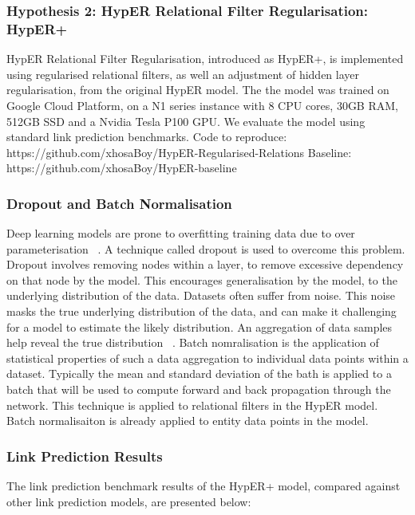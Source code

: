 \subsubsection{Hypothesis 2: \newline 
HypER Relational Filter Regularisation: HypER+}
HypER Relational Filter Regularisation, introduced as HypER+, is implemented using regularised relational filters, as well an adjustment of hidden layer regularisation, from the original HypER model. \newline
The the model was trained on Google Cloud Platform, on a N1 series instance with  8 CPU cores, 30GB RAM, 512GB SSD and a Nvidia Tesla P100 GPU. \newline
We evaluate the model using standard link prediction benchmarks. \newline 
Code to reproduce: https://github.com/xhosaBoy/HypER-Regularised-Relations \newline
Baseline: https://github.com/xhosaBoy/HypER-baseline

\subsubsection{Dropout and Batch Normalisation}
Deep learning models are prone to overfitting training data due to over parameterisation ~\citep{dropout paper}. A technique called dropout is used to overcome this problem. 
Dropout involves removing nodes within a layer, to remove excessive dependency on that node by the model. This encourages generalisation by the model, to the underlying distribution of the data. \newline  
Datasets often suffer from noise. This noise masks the true underlying distribution of the data, and can make it challenging for a model to estimate the likely distribution.
An aggregation of data samples help reveal the true distribution ~\citep{Book about statistical machine learning}. Batch nomralisation is the application of statistical properties of such a data aggregation
to individual data points within a dataset. Typically the mean and standard deviation of the bath is applied to a batch that will be used to compute forward and back propagation through the network. \newline
This technique is applied to relational filters in the HypER model. Batch normalisaiton is already applied to entity data points in the model. 

\subsubsection{Link Prediction Results}
The link prediction benchmark results of the HypER+ model, compared against other link prediction models, are presented below:

